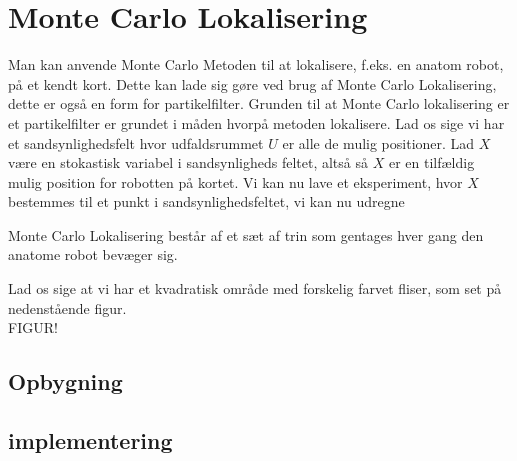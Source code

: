 \documentclass[../../SRP.tex]{subfiles}
\begin{document}
\chapter{Monte Carlo Lokalisering}

Man kan anvende Monte Carlo Metoden til at lokalisere, f.eks. en anatom robot, på et kendt kort. Dette kan lade sig gøre ved brug af Monte Carlo Lokalisering, dette er også en form for partikelfilter. Grunden til at Monte Carlo lokalisering er et partikelfilter er grundet i måden hvorpå metoden lokalisere. Lad os sige vi har et sandsynlighedsfelt hvor udfaldsrummet $U$ er alle de mulig positioner. Lad $X$ være en stokastisk variabel i sandsynligheds feltet, altså så $X$ er en tilfældig mulig position for robotten på kortet. Vi kan nu lave et eksperiment, hvor $X$ bestemmes til et punkt i sandsynlighedsfeltet, vi kan nu udregne 

Monte Carlo Lokalisering består af et sæt af trin som gentages hver gang den anatome robot bevæger sig. 

Lad os sige at vi har et kvadratisk område med forskelig farvet fliser, som set på nedenstående figur. \\

\Huge{FIGUR!} \\

\section{Opbygning}

\section{implementering}
\end{document}

